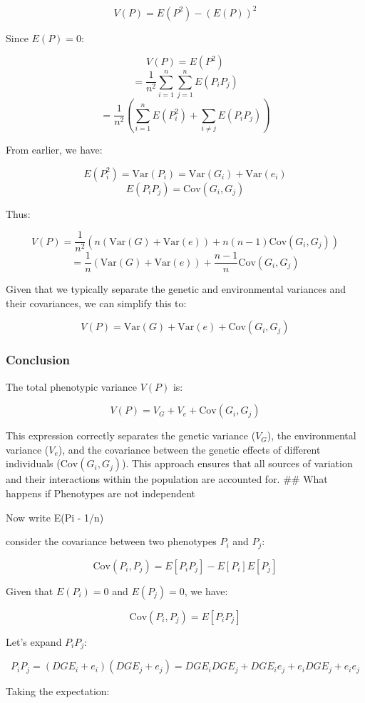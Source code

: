 \documentclass[
]{article}
\begin{document}
\[ V(P) = E(P^2) - (E(P))^2 \]

Since \(E(P) = 0\):

\[ V(P) = E(P^2) \]
\[ = \frac{1}{n^2} \sum_{i=1}^n \sum_{j=1}^n E(P_i P_j) \]
\[ = \frac{1}{n^2} \left( \sum_{i=1}^n E(P_i^2) + \sum_{i \neq j} E(P_i P_j) \right) \]

From earlier, we have:

\[ E(P_i^2) = \text{Var}(P_i) = \text{Var}(G_i) + \text{Var}(e_i) \]
\[ E(P_i P_j) = \text{Cov}(G_i, G_j) \]

Thus:

\[ V(P) = \frac{1}{n^2} \left( n (\text{Var}(G) + \text{Var}(e)) + n(n-1) \text{Cov}(G_i, G_j) \right) \]
\[ = \frac{1}{n} (\text{Var}(G) + \text{Var}(e)) + \frac{n-1}{n} \text{Cov}(G_i, G_j) \]

Given that we typically separate the genetic and environmental variances
and their covariances, we can simplify this to:

\[ V(P) = \text{Var}(G) + \text{Var}(e) + \text{Cov}(G_i, G_j) \]

\subsubsection{Conclusion}\label{conclusion}

The total phenotypic variance \(V(P)\) is:

\[ V(P) = V_G + V_e + \text{Cov}(G_i, G_j) \]

This expression correctly separates the genetic variance (\(V_G\)), the
environmental variance (\(V_e\)), and the covariance between the genetic
effects of different individuals (\(\text{Cov}(G_i, G_j)\)). This
approach ensures that all sources of variation and their interactions
within the population are accounted for. \#\# What happens if Phenotypes
are not independent

Now write E(Pi - 1/n)

consider the covariance between two phenotypes \(P_i\) and \(P_j\):

\[ \text{Cov}(P_i, P_j) = E[P_i P_j] - E[P_i]E[P_j] \]

Given that \(E(P_i) = 0\) and \(E(P_j) = 0\), we have:

\[ \text{Cov}(P_i, P_j) = E[P_i P_j] \]

Let's expand \(P_i P_j\):

\[ P_i P_j = (DGE_i + e_i)(DGE_j + e_j) = DGE_i DGE_j + DGE_i e_j + e_i DGE_j + e_i e_j \]

Taking the expectation:
\end{document}
